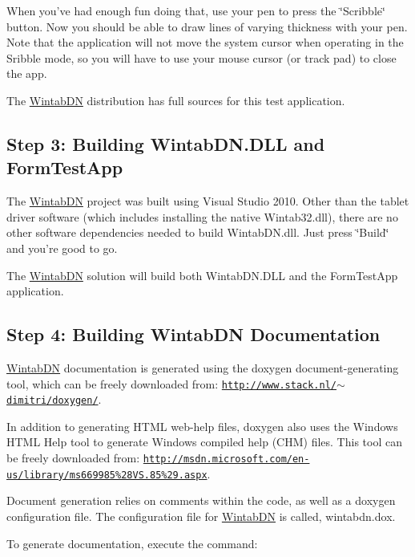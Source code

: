 When you've had enough fun doing that, use your pen to press the \char`\"{}Scribble\char`\"{} button. Now you should be able to draw lines of varying thickness with your pen. Note that the application will not move the system cursor when operating in the Sribble mode, so you will have to use your mouse cursor (or track pad) to close the app.

The \hyperlink{namespace_wintab_d_n}{WintabDN} distribution has full sources for this test application.\hypertarget{page1_step3}{}\subsection{Step 3: Building WintabDN.DLL and FormTestApp}\label{page1_step3}
The \hyperlink{namespace_wintab_d_n}{WintabDN} project was built using Visual Studio 2010. Other than the tablet driver software (which includes installing the native Wintab32.dll), there are no other software dependencies needed to build WintabDN.dll. Just press \char`\"{}Build\char`\"{} and you're good to go.

The \hyperlink{namespace_wintab_d_n}{WintabDN} solution will build both WintabDN.DLL and the FormTestApp application.\hypertarget{page1_step4}{}\subsection{Step 4: Building WintabDN Documentation}\label{page1_step4}
\hyperlink{namespace_wintab_d_n}{WintabDN} documentation is generated using the doxygen document-\/generating tool, which can be freely downloaded from: \href{http://www.stack.nl/~dimitri/doxygen/}{\tt http://www.stack.nl/$\sim$dimitri/doxygen/}.

In addition to generating HTML web-\/help files, doxygen also uses the Windows HTML Help tool to generate Windows compiled help (CHM) files. This tool can be freely downloaded from: \href{http://msdn.microsoft.com/en-us/library/ms669985%28VS.85%29.aspx}{\tt http://msdn.microsoft.com/en-\/us/library/ms669985\%28VS.85\%29.aspx}.

Document generation relies on comments within the code, as well as a doxygen configuration file. The configuration file for \hyperlink{namespace_wintab_d_n}{WintabDN} is called, wintabdn.dox.

To generate documentation, execute the command: \begin{DoxyParagraph}{}
{ } 
\end{DoxyParagraph}
